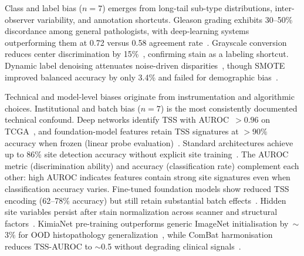 Class and label bias ($n\!=\!7$) emerges from long-tail sub-type distributions, inter-observer variability, and annotation shortcuts. Gleason grading exhibits 30--50\% discordance among general pathologists, with deep-learning systems outperforming them at 0.72 versus 0.58 agreement rate~\citep{nagpal2020development}. Grayscale conversion reduces center discrimination by 15\%~\citep{kheiri2025investigation, hagele2020resolving}, confirming stain as a labeling shortcut. Dynamic label denoising attenuates noise-driven disparities~\citep{liang2023dynamic}, though SMOTE improved balanced accuracy by only 3.4\% and failed for demographic bias~\citep{rezama2018imbalanced}.

Technical and model-level biases originate from instrumentation and algorithmic choices. Institutional and batch bias ($n\!=\!7$) is the most consistently documented technical confound. Deep networks identify TSS with AUROC~${>}0.96$ on TCGA~\citep{howard2021site}, and foundation-model features retain TSS signatures at ${>}90\%$ accuracy when frozen (linear probe evaluation)~\citep{komen2024batch, dehkharghanian2023biased}. Standard architectures achieve up to 86\% site detection accuracy without explicit site training~\citep{dehkharghanian2023biased}. The AUROC metric (discrimination ability) and accuracy (classification rate) complement each other: high AUROC indicates features contain strong site signatures even when classification accuracy varies. Fine-tuned foundation models show reduced TSS encoding (62--78\% accuracy) but still retain substantial batch effects~\citep{komen2024batch}. Hidden site variables persist after stain normalization across scanner and structural factors~\citep{schmitt2021hidden, bidgoli2022bias, mazaheri2023ranking}. KimiaNet pre-training outperforms generic ImageNet initialisation by~$\sim$3\% for OOD histopathology generalization~\citep{sikaroudi2023generalization}, while ComBat harmonisation reduces TSS-AUROC to $\sim$0.5 without degrading clinical signals~\citep{murchan2024combat}.

